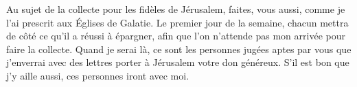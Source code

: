Au sujet de la collecte pour les fidèles de Jérusalem,
	faites, vous aussi, comme je l’ai prescrit aux Églises de Galatie.
Le premier jour de la semaine,
	chacun mettra de côté ce qu’il a réussi à épargner,
	afin que l’on n’attende pas mon arrivée pour faire la collecte.
Quand je serai là, ce sont les personnes jugées aptes par vous
	que j’enverrai avec des lettres porter à Jérusalem votre don généreux.
S’il est bon que j’y aille aussi, ces personnes iront avec moi.
